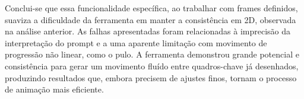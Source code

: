 Conclui-se que essa funcionalidade específica, ao trabalhar com frames definidos, suaviza a dificuldade da ferramenta em manter a consistência em 2D, observada na análise anterior. As falhas apresentadas foram relacionadas à imprecisão da interpretação do prompt e a uma aparente limitação com movimento de progressão não linear, como o pulo. A ferramenta demonstrou grande potencial e consistência para gerar um movimento fluído entre quadros-chave já desenhados, produzindo resultados que, embora precisem de ajustes finos, tornam o processo de animação mais eficiente.

